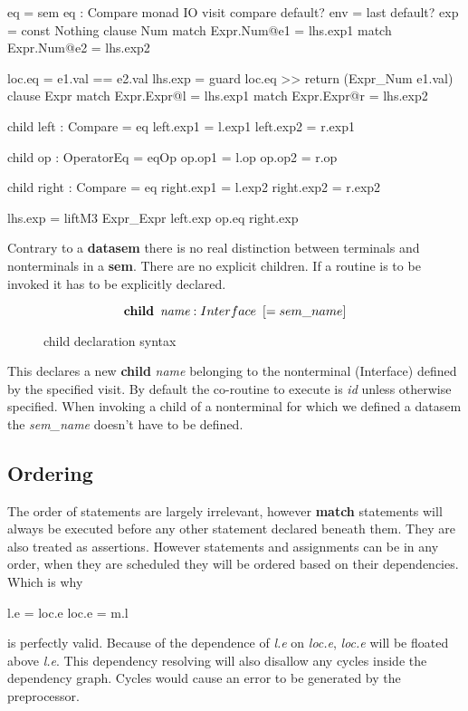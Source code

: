 \begin{code}
eq = sem eq : Compare monad IO
       visit compare
         default? env = last
         default? exp = const Nothing
         clause Num
           match Expr.Num@e1 = lhs.exp1
           match Expr.Num@e2 = lhs.exp2
           
           loc.eq  = e1.val == e2.val
           lhs.exp = guard loc.eq >> return (Expr_Num e1.val)
         clause Expr
           match Expr.Expr@l = lhs.exp1
           match Expr.Expr@r = lhs.exp2
           
           child left : Compare = eq
           left.exp1 = l.exp1
           left.exp2 = r.exp1
           
           child op : OperatorEq = eqOp
           op.op1 = l.op
           op.op2 = r.op
           
           child right : Compare = eq
           right.exp1 = l.exp2
           right.exp2 = r.exp2
           
           lhs.exp = liftM3 Expr_Expr left.exp op.eq right.exp
\end{code}

Contrary to a \textbf{datasem} there is no real distinction between terminals and nonterminals in a \textbf{sem}. There are no explicit children. If a routine is to be invoked it has to be explicitly declared.

\begin{figure}[h!]
\[
\textbf{child} \hspace{5pt} \emph{name} : Interface \hspace{5pt} [= sem\_name]
\]
\caption{child declaration syntax}
\end{figure}

This declares a new \textbf{child} \emph{name} belonging to the nonterminal (Interface) defined by the specified visit\cite{visitag}. By default the co-routine to execute is \emph{id} unless otherwise specified. When invoking a child of a nonterminal for which we defined a datasem the \emph{sem\_name} doesn't have to be defined.

\subsection{Ordering}
The order of statements are largely irrelevant, however \textbf{match} statements will always be executed before any other statement declared beneath them. They are also treated as assertions. However statements and assignments can be in any order, when they are scheduled they will be ordered based on their dependencies. Which is why

\begin{code}
l.e = loc.e
loc.e = m.l
\end{code}

is perfectly valid. Because of the dependence of \emph{l.e} on \emph{loc.e}, \emph{loc.e} will be floated above \emph{l.e}. This dependency resolving will also disallow any cycles inside the dependency graph. Cycles would cause an error to be generated by the preprocessor.
